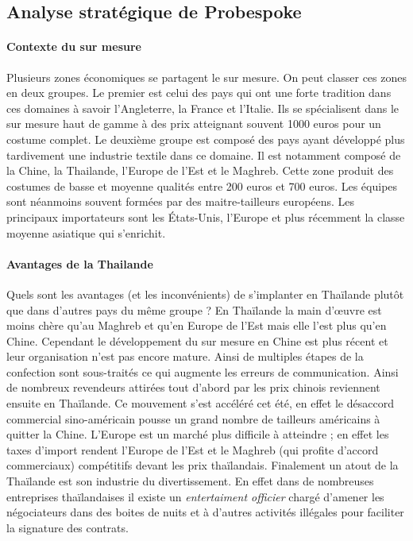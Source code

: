 \subsection{Analyse stratégique de Probespoke}
\paragraph{Contexte du sur mesure}
 Plusieurs zones économiques se partagent le sur mesure. On peut classer ces zones en deux groupes. Le premier est celui des pays qui ont une forte tradition dans ces domaines à savoir l'Angleterre, la France et l'Italie. Ils se spécialisent dans le sur mesure haut de gamme à des prix atteignant souvent 1000 euros pour un costume complet. Le deuxième groupe est composé des pays ayant développé plus tardivement une industrie textile dans ce domaine. Il est notamment composé de la Chine, la Thailande, l'Europe de l'Est et le Maghreb. Cette zone produit des costumes de basse et moyenne qualités entre 200 euros et 700 euros. Les équipes sont néanmoins souvent formées par des maitre-tailleurs européens.  Les principaux importateurs sont les États-Unis, l'Europe et plus récemment la classe moyenne asiatique qui s'enrichit.
\paragraph{Avantages de la Thailande} Quels sont les avantages (et les inconvénients) de s'implanter en Thaïlande plutôt que dans d'autres pays du même groupe ? En Thaïlande la main d'œuvre est moins chère qu'au Maghreb et qu'en Europe de l'Est mais elle l'est plus qu'en Chine. Cependant le développement du sur mesure en Chine est plus récent et leur organisation n'est pas encore mature. Ainsi de multiples étapes de la confection sont sous-traités ce qui augmente les erreurs de communication. Ainsi de nombreux revendeurs attirées tout d'abord par les prix chinois reviennent ensuite en Thaïlande. Ce mouvement s'est accéléré cet été, en effet le désaccord commercial sino-américain pousse un grand nombre de tailleurs américains à quitter la Chine. L'Europe est un marché plus difficile à atteindre ; en effet les taxes d'import rendent l'Europe de l'Est et le Maghreb (qui profite d'accord commerciaux) compétitifs devant les prix thaïlandais. Finalement un atout de la Thaïlande est son industrie du divertissement. En effet dans de nombreuses entreprises thaïlandaises il existe un \textit{entertaiment officier} chargé d'amener les négociateurs dans des boites de nuits et à d'autres activités illégales pour faciliter la signature des contrats.

